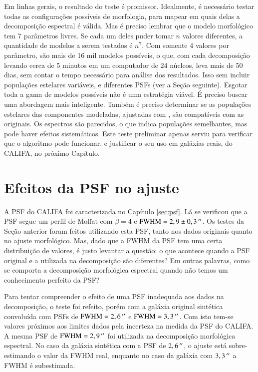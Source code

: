 Em linhas gerais, o resultado do teste é promissor. Idealmente, é necessário
testar todas as configurações possíveis de morfologia, para mapear em quais
delas a decomposição espectral é válida. Mas é preciso lembrar que o modelo
morfológico tem 7 parâmetros livres. Se cada um deles puder tomar $n$ valores
diferentes, a quantidade de modelos a serem testados é $n^7$. Com somente 4
valores por parâmetro, são mais de 16 mil modelos possíveis, o que, com cada
decomposição levando cerca de 5 minutos em um computador de 24 núcleos, leva
mais de 50 dias, sem contar o tempo necessário para análise dos resultados. Isso
sem incluir populações estelares variáveis, e diferentes PSFs (ver a Seção
seguinte). Esgotar toda a gama de modelos possíveis não é uma estratégia viável.
É preciso buscar uma abordagem mais inteligente. Também é preciso determinar se
as populações estelares das componentes modeladas, ajustadas com \starlight, são
compatíveis com as originais. Os espectros são parecidos, o que indica
populações semelhantes, mas pode haver efeitos sistemáticos. Este teste
preliminar apenas serviu para verificar que o algoritmo pode funcionar, e
justificar o seu uso em galáxias reais, do CALIFA, no próximo Capítulo.

\section{Efeitos da PSF no ajuste}
\label{sec:test:psf}

A PSF do CALIFA foi caracterizada no Capítulo \ref{sec:psf}. Lá se verificou que
a PSF segue um perfil de Moffat com $\beta=4$ e $\mathrm{FWHM} = 2,9 \pm
0,3\,^{\prime\prime}$. Os testes da Seção anterior foram feitos utilizando esta PSF, tanto
nos dados originais quanto no ajuste morfológico. Mas, dado que a FWHM da PSF
tem uma certa distribuição de valores, é justo levantar a questão: o que
acontece quando a PSF original e a utilizada na decomposição são diferentes? Em
outras palavras, como se comporta a decomposição morfológica espectral quando
não temos um conhecimento perfeito da PSF?

Para tentar compreender o efeito de uma PSF inadequada aos dados na
decomposição, o teste foi refeito, porém com a galáxia original sintética
convoluída com PSFs de $\mathrm{FWHM} = 2,6\,^{\prime\prime}$ e $\mathrm{FWHM} =
3,3\,^{\prime\prime}$. Com isto tem-se valores próximos aos limites dados pela incerteza
na medida da PSF do CALIFA. A mesma PSF de $\mathrm{FWHM} = 2,9\,^{\prime\prime}$ foi
utilizada na decomposição morfológica espectral. No caso da galáxia sintética
com a PSF de $2,6\,^{\prime\prime}$, o ajuste está sobre-estimando o valor da FWHM real,
enquanto no caso da galáxia com $3,3\,^{\prime\prime}$ a FWHM é subestimada.

